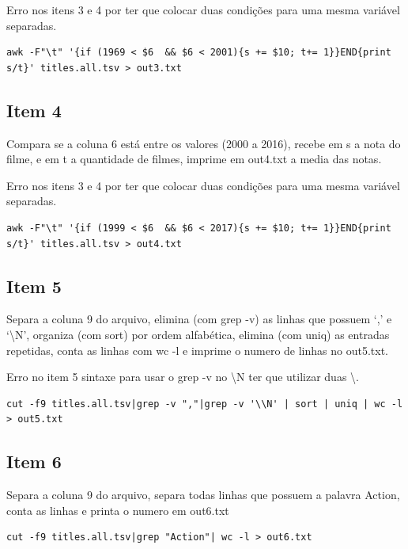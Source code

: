 \documentclass[12pt]{article}
\begin{document}
Erro nos itens 3 e 4 por ter que colocar duas condições para uma mesma variável separadas.

\begin{verbatim}
awk -F"\t" '{if (1969 < $6  && $6 < 2001){s += $10; t+= 1}}END{print s/t}' titles.all.tsv > out3.txt
\end{verbatim}

\subsection*{Item 4}

Compara se a coluna 6 está entre os valores (2000 a 2016), recebe em s a nota do filme, e em t a quantidade de filmes, imprime em out4.txt a media das notas.

Erro nos itens 3 e 4 por ter que colocar duas condições para uma mesma variável separadas.

\begin{verbatim}
awk -F"\t" '{if (1999 < $6  && $6 < 2017){s += $10; t+= 1}}END{print s/t}' titles.all.tsv > out4.txt
\end{verbatim}

\subsection*{Item 5}

Separa a coluna 9 do arquivo, elimina (com grep -v) as linhas que possuem `,' e `\textbackslash	N', organiza (com sort) por ordem alfabética, elimina (com uniq) as entradas repetidas, conta as linhas com wc -l e imprime o numero de linhas no out5.txt.

Erro no item 5 sintaxe para usar o grep -v no \textbackslash N ter que utilizar duas \textbackslash .

\begin{verbatim}
cut -f9 titles.all.tsv|grep -v ","|grep -v '\\N' | sort | uniq | wc -l > out5.txt
\end{verbatim}

\subsection*{Item 6}

Separa a coluna 9 do arquivo, separa todas linhas que possuem a palavra Action, conta as linhas e printa o numero em out6.txt

\begin{verbatim}
cut -f9 titles.all.tsv|grep "Action"| wc -l > out6.txt
\end{verbatim}
\end{document}
